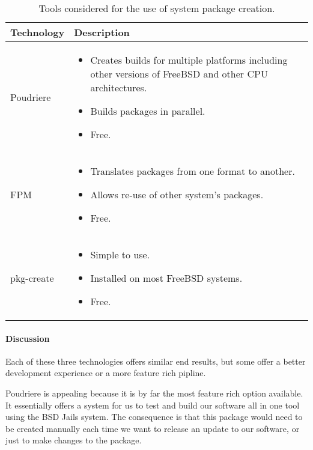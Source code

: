 \begin{table}[H]
  \begin{center}
    \begin{tabular}{ | l | p{10cm} |}
      \hline
      Technology & Description  \\ \hline
      Poudriere \cite{poudriere-tutorial} &
      \begin{itemize}
        \item Creates builds for multiple platforms including other versions of FreeBSD and other CPU architectures.
        \item Builds packages in parallel.
        \item Free.
      \end{itemize}\\ \hline
      FPM \cite{fpm-home} &
      \begin{itemize}
        \item Translates packages from one format to another.
        \item Allows re-use of other system's packages.
        \item Free.
      \end{itemize}\\ \hline
      pkg-create \cite{pkg-create-man} &
      \begin{itemize}
        \item Simple to use.
        \item Installed on most FreeBSD systems.
        \item Free.
      \end{itemize}\\ \hline
    \end{tabular}
  \end{center}
  \caption{Tools considered for the use of system package creation.}
\end{table}

\paragraph{Discussion}

Each of these three technologies offers similar end results, but some offer a better development experience or a more feature rich pipline.

Poudriere is appealing because it is by far the most feature rich option available.
It essentially offers a system for us to test and build our software all in one tool using the BSD Jails system.
The consequence is that this package would need to be created manually each time we want to release an update to our software, or just to make changes to the package.

